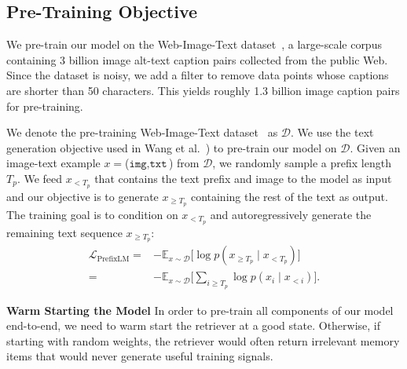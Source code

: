 \documentclass[10pt,twocolumn,letterpaper]{article}
\begin{document}
\subsection{Pre-Training Objective} \label{sec:objective}
We pre-train our model on the Web-Image-Text dataset~\cite{DBLP:conf/cvpr/ZhaiWMSK0B22}, a large-scale corpus containing 3 billion image alt-text caption pairs collected from the public Web. Since the dataset is noisy, we add a filter to remove data points whose captions are shorter than 50 characters. This yields roughly 1.3 billion image caption pairs for pre-training.

We denote the pre-training Web-Image-Text dataset~\cite{DBLP:conf/cvpr/ZhaiWMSK0B22} as $\mathcal{D}$. We use the text generation objective used in Wang et al.~\cite{DBLP:conf/iclr/WangYYDT022}) to pre-train our model on $\mathcal{D}$. Given an image-text example $x=$($\texttt{img}, \texttt{txt}$) from $\mathcal{D}$,
we randomly sample a prefix length $T_{p}$. We feed $x_{<T_p}$ that contains the text prefix and image to the model as input and our objective is to generate $x_{\geq T_p}$ containing the rest of the text as output. The training goal is to condition on $x_{<T_{p}}$ and autoregressively generate the remaining text sequence $x_{\geq T_{p}}$:
{\small
\begin{align}
    \mathcal{L}_{\text{PrefixLM}} = & -\mathbb{E}_{x \sim \mathcal{D}}  \big[ {\log p(x_{\geq T_{p}} \mid x_{<T_{p}})}  \big] \\
   = &  -\mathbb{E}_{x \sim \mathcal{D}} \Big[ \sum_{i \geq T_{p}} {\log p(x_i \mid x_{<i})  } \Big]. \nonumber  
\end{align}
}

\textbf{Warm Starting the Model} In order to pre-train all components of our model end-to-end, we need to warm start the retriever at a good state. Otherwise, if starting with random weights, the retriever would often return irrelevant memory items that would never generate useful training signals.
\end{document}

